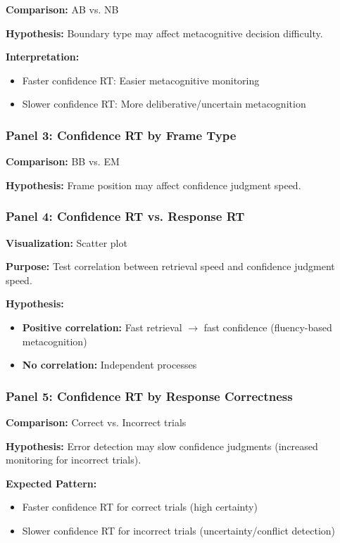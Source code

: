 \documentclass[12pt,a4paper]{article}
\begin{document}
\textbf{Comparison:} AB vs. NB

\textbf{Hypothesis:} Boundary type may affect metacognitive decision difficulty.

\textbf{Interpretation:}
\begin{itemize}
    \item Faster confidence RT: Easier metacognitive monitoring
    \item Slower confidence RT: More deliberative/uncertain metacognition
\end{itemize}

\subsubsection{Panel 3: Confidence RT by Frame Type}

\textbf{Comparison:} BB vs. EM

\textbf{Hypothesis:} Frame position may affect confidence judgment speed.

\subsubsection{Panel 4: Confidence RT vs. Response RT}

\textbf{Visualization:} Scatter plot

\textbf{Purpose:} Test correlation between retrieval speed and confidence judgment speed.

\textbf{Hypothesis:}
\begin{itemize}
    \item \textbf{Positive correlation:} Fast retrieval $\rightarrow$ fast confidence (fluency-based metacognition)
    \item \textbf{No correlation:} Independent processes
\end{itemize}

\subsubsection{Panel 5: Confidence RT by Response Correctness}

\textbf{Comparison:} Correct vs. Incorrect trials

\textbf{Hypothesis:} Error detection may slow confidence judgments (increased monitoring for incorrect trials).

\textbf{Expected Pattern:}
\begin{itemize}
    \item Faster confidence RT for correct trials (high certainty)
    \item Slower confidence RT for incorrect trials (uncertainty/conflict detection)
\end{itemize}
\end{document}
